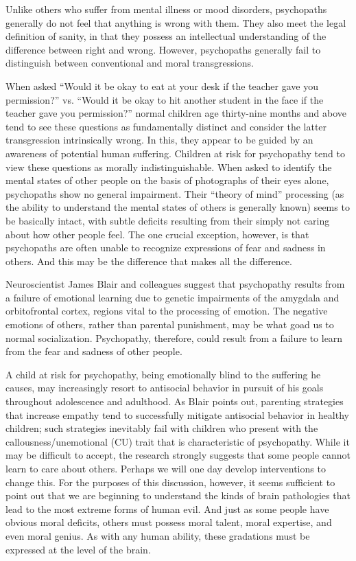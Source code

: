 \documentclass[a4paper,14pt]{extarticle}
\begin{document}
Unlike others who suffer from mental illness or mood disorders, psychopaths generally do not feel that anything is wrong with them.
They also meet the legal definition of sanity, in that they possess an intellectual understanding of the difference between right and wrong.
However, psychopaths generally fail to distinguish between conventional and moral transgressions.

When asked ``Would it be okay to eat at your desk if the teacher gave you permission?'' vs. ``Would it be okay to hit another student in the face if the teacher gave you permission?'' normal children age thirty-nine months and above tend to see these questions as fundamentally distinct and consider the latter transgression intrinsically wrong.
In this, they appear to be guided by an awareness of potential human suffering.
Children at risk for psychopathy tend to view these questions as morally indistinguishable.
When asked to identify the mental states of other people on the basis of photographs of their eyes alone, psychopaths show no general impairment.
Their ``theory of mind'' processing (as the ability to understand the mental states of others is generally known) seems to be basically intact, with subtle deficits resulting from their simply not caring about how other people feel.
The one crucial exception, however, is that psychopaths are often unable to recognize expressions of fear and sadness in others.
And this may be the difference that makes all the difference.

Neuroscientist James Blair and colleagues suggest that psychopathy results from a failure of emotional learning due to genetic impairments of the amygdala and orbitofrontal cortex, regions vital to the processing of emotion.
The negative emotions of others, rather than parental punishment, may be what goad us to normal socialization.
Psychopathy, therefore, could result from a failure to learn from the fear and sadness of other people.

A child at risk for psychopathy, being emotionally blind to the suffering he causes, may increasingly resort to antisocial behavior in pursuit of his goals throughout adolescence and adulthood.
As Blair points out, parenting strategies that increase empathy tend to successfully mitigate antisocial behavior in healthy children;
such strategies inevitably fail with children who present with the callousness/unemotional (CU) trait that is characteristic of psychopathy.
While it may be difficult to accept, the research strongly suggests that some people cannot learn to care about others.
Perhaps we will one day develop interventions to change this.
For the purposes of this discussion, however, it seems sufficient to point out that we are beginning to understand the kinds of brain pathologies that lead to the most extreme forms of human evil.
And just as some people have obvious moral deficits, others must possess moral talent, moral expertise, and even moral genius.
As with any human ability, these gradations must be expressed at the level of the brain.
\end{document}
